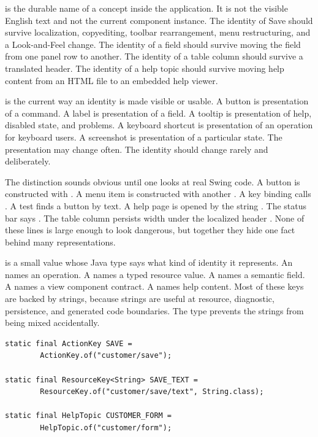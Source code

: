  is the durable name of a concept
inside the application. It is not the visible English text and not the current
component instance. The identity of Save should survive localization,
copyediting, toolbar rearrangement, menu restructuring, and a Look-and-Feel
change. The identity of a field should survive moving the field from one panel
row to another. The identity of a table column should survive a translated
header. The identity of a help topic should survive moving help content from an
HTML file to an embedded help viewer.

 is the current way an identity is made
visible or usable. A button is presentation of a command. A label is
presentation of a field. A tooltip is presentation of help, disabled state, and
problems. A keyboard shortcut is presentation of an operation for keyboard
users. A screenshot is presentation of a particular state. The presentation may
change often. The identity should change rarely and deliberately.

The distinction sounds obvious until one looks at real Swing code. A button is
constructed with . A menu item is constructed with another
. A key binding calls . A test finds a button by
text. A help page is opened by the string . The status
bar says . The table column persists width under the
localized header . None of these lines is large enough to look
dangerous, but together they hide one fact behind many representations.

 is a small value whose Java type says what kind
of identity it represents. An  names an operation. A
 names a typed resource value. A 
names a semantic field. A  names a view component contract. A
 names help content. Most of these keys are backed by strings,
because strings are useful at resource, diagnostic, persistence, and generated
code boundaries. The type prevents the strings from being mixed accidentally.

\begin{lstlisting}[caption={Different identities, different key types.}]
static final ActionKey SAVE =
        ActionKey.of("customer/save");

static final ResourceKey<String> SAVE_TEXT =
        ResourceKey.of("customer/save/text", String.class);

static final HelpTopic CUSTOMER_FORM =
        HelpTopic.of("customer/form");
\end{lstlisting}


